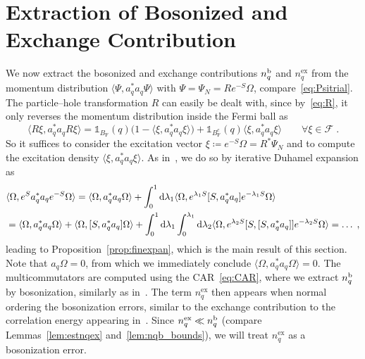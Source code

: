 \documentclass[12pt,a4paper]{article}
\numberwithin{equation}{section}
\newcommand{\cF}{\mathcal{F}}
\newcommand{\1}{\mathbb{I}}
\renewcommand{\b}{\textnormal{b}}
\newcommand{\di}{\textnormal{d}}
\newcommand{\ex}{\mathrm{ex}}
\newcommand{\F}{\mathrm{F}}
\theoremstyle{plain}
\theoremstyle{definition}
\theoremstyle{remark}
\theoremstyle{plain}
\theoremstyle{definition}
\theoremstyle{remark}
\begin{document}
\section{Extraction of Bosonized and Exchange Contribution}\label{sec:extraction}



We now extract the bosonized and exchange contributions $ n_q^{\b} $ and $ n_q^{\ex} $ from the momentum distribution $ \langle \Psi, a_q^* a_q \Psi \rangle $ with $ \Psi = \Psi_N = R e^{-S} \Omega $, compare~\eqref{eq:Psitrial}. The particle--hole transformation $ R $ can easily be dealt with, since by~\eqref{eq:R}, it only reverses the momentum distribution inside the Fermi ball as
\begin{equation} \label{eq:momentum_dist_R_trafo}
	\langle R \xi, a_q^* a_q R \xi \rangle
	= \mathds{1}_{B_{\F}}(q) \big( 1 - \langle \xi, a_q^* a_q \xi \rangle \big)
		+ \mathds{1}_{B_{\F}^c}(q) \langle \xi, a_q^* a_q \xi \rangle \qquad
		\forall \xi \in \cF \;.
\end{equation}
So it suffices to consider the excitation vector $ \xi \coloneq e^{-S} \Omega = R^* \Psi_N $ and to compute the excitation density $ \langle \xi, a_q^* a_q \xi \rangle $. As in~\cite{BL25}, we do so by iterative Duhamel expansion as
\begin{equation} \label{eq:duhamelexpansion_blueprint}
\begin{aligned}
	&\langle \Omega, e^{S} a_q^* a_q e^{-S} \Omega \rangle
	= \langle \Omega, a_q^* a_q \Omega \rangle
		+ \int_0^1 \di \lambda_1 \langle \Omega, e^{\lambda_1 S} [S, a_q^* a_q] e^{-\lambda_1 S} \Omega \rangle \\
	&= \langle \Omega, a_q^* a_q \Omega \rangle
		+ \langle \Omega, [S, a_q^* a_q] \Omega \rangle
		+ \int_0^1 \di \lambda_1 \int_0^{\lambda_1} \di \lambda_2 \langle \Omega, e^{\lambda_2 S} [S,[S, a_q^* a_q]] e^{-\lambda_2 S} \Omega \rangle
	= \ldots \;,
\end{aligned}
\end{equation}
leading to Proposition~\ref{prop:finexpan}, which is the main result of this section. Note that $ a_q \Omega = 0 $, from which we immediately conclude $ \langle \Omega, a_q^* a_q \Omega \rangle = 0 $. The multicommutators are computed using the CAR~\eqref{eq:CAR}, where we extract $ n_q^{\b} $ by bosonization, similarly as in~\cite{BL25}. The term $ n_q^{\ex} $ then appears when normal ordering the bosonization errors, similar to the exchange contribution to the correlation energy appearing in~\cite{CHN23}. Since $ n_q^{\ex} \ll n_q^{\b} $ (compare Lemmas~\ref{lem:estnqex} and~\ref{lem:nqb_bounds}), we will treat $ n_q^{\ex} $ as a bosonization error.
\end{document}
